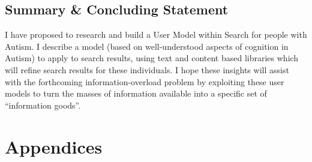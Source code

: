 \documentclass[a4paper, 11pt]{article}
\begin{document}
\subsection{Summary \& Concluding Statement}\label{future}
I have proposed to research and build a User Model within Search for people with Autism. I describe a model (based on well-understood aspects of cognition in Autism) to apply to search results, using text and content based libraries which will refine search results for these individuals. I hope these insights will assist with the forthcoming information-overload problem by exploiting these user models to turn the masses of information available into a specific set of “information goods”. 

\clearpage

\section{Appendices}
\end{document}
